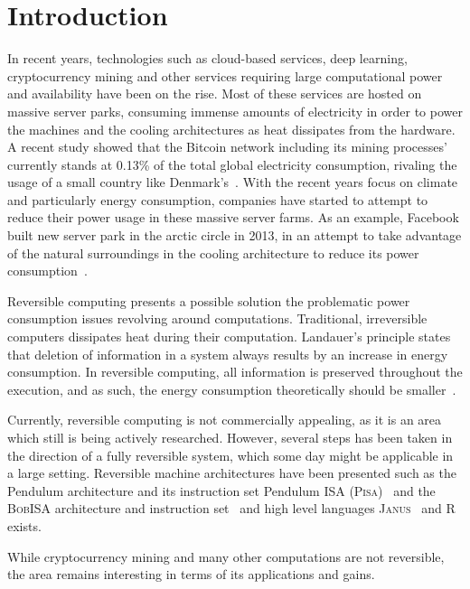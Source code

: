 \chapter{Introduction}
\label{chp:introduction}
In recent years, technologies such as cloud-based services, deep learning, cryptocurrency mining and other services requiring large computational power and availability have been on the rise. Most of these services are hosted on massive server parks, consuming immense amounts of electricity in order to power the machines and the cooling architectures as heat dissipates from the hardware. A recent study showed that the Bitcoin network including its mining processes' currently stands at 0.13\% of the total global electricity consumption, rivaling the usage of a small country like Denmark's~\cite{digiconomist:bitcoin}. With the recent years focus on climate and particularly energy consumption, companies have started to attempt to reduce their power usage in these massive server farms. As an example, Facebook built new server park in the arctic circle in 2013, in an attempt to take advantage of the natural surroundings in the cooling architecture to reduce its power consumption~\cite{bloomberg:facebook}. 

Reversible computing presents a possible solution the problematic power consumption issues revolving around computations. Traditional, irreversible computers dissipates heat during their computation. Landauer's principle states that deletion of information in a system always results by an increase in energy consumption. In reversible computing, all information is preserved throughout the execution, and as such, the energy consumption theoretically should be smaller~\cite{rl:irreversibility}.

Currently, reversible computing is not commercially appealing, as it is an area which still is being actively researched. However, several steps has been taken in the direction of a fully reversible system, which some day might be applicable in a large setting. Reversible machine architectures have been presented such as the Pendulum architecture and its instruction set Pendulum ISA (\textsc{Pisa})~\cite{cv:pendulum, ha:architecture} and the \textsc{BobISA} architecture and instruction set~\cite{mt:bob} and high level languages \textsc{Janus}~\cite{cl:janus, ty:janus, ty:ejanus} and \textsc{R}~\cite{mf:r} exists. 

While cryptocurrency mining and many other computations are not reversible, the area remains interesting in terms of its applications and gains.


